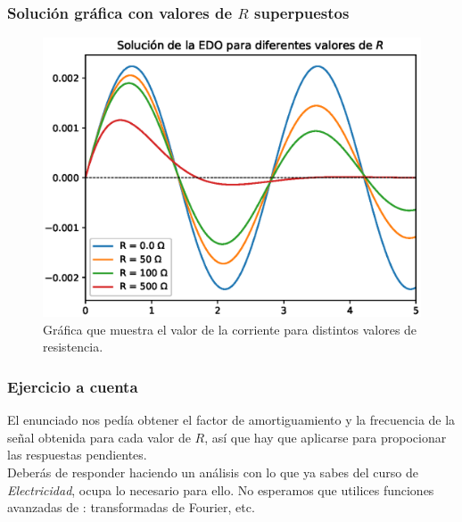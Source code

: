 \begin{frame}[plain]    
\frametitle{Solución gráfica con valores de $R$ superpuestos}
\begin{figure}
    \centering
    \includegraphics[scale=0.5]{Imagenes/ejercicio_odeint_03_circuito_RLC.eps}
    \caption{Gráfica que muestra el valor de la corriente para distintos valores de resistencia.}
\end{figure}
\end{frame}
\begin{frame}
\frametitle{\textbf{Ejercicio a cuenta}}
El enunciado nos pedía obtener el factor de amortiguamiento y la frecuencia de la señal obtenida para cada valor de $R$, así que hay que aplicarse para propocionar las respuestas pendientes.
\\
\bigskip
Deberás de responder haciendo un análisis con lo que ya sabes del curso de \emph{Electricidad}, ocupa lo necesario para ello. No esperamos que utilices funciones avanzadas de \python: transformadas de Fourier, etc.
\end{frame}
